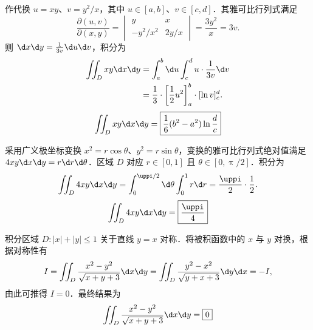 \begin{solution}
    作代换 $u = xy$、$v = y^2/x$，其中 $u \in [a, b]$、$v \in [c, d]$．其雅可比行列式满足
    \begin{equation}
        \frac{\partial(u,v)}{\partial(x,y)} = \begin{vmatrix} y & x \\ -y^2/x^2 & 2y/x \end{vmatrix} = \frac{3y^2}{x} = 3v.
    \end{equation}
    则 $\d x \d y = \frac{1}{3v} \d u \d v$，积分为
    \begin{equation}
        \begin{aligned}
            \iint_D xy \d x \d y & = \int_a^b \d u \int_c^d u \cdot \frac{1}{3v} \d v                       \\
                                 & = \frac{1}{3} \cdot \left[ \frac{1}{2}u^2 \right]_a^b \cdot [\ln v]_c^d.
        \end{aligned}
    \end{equation}
    \begin{equation}
        \iint_D xy \d x \d y = \boxed{\frac{1}{6}(b^2-a^2) \ln \frac{d}{c}}
    \end{equation}


    采用广义极坐标变换 $x^2 = r \cos \theta$、$y^2 = r \sin \theta$，变换的雅可比行列式绝对值满足 $4xy \d x \d y = r \d r \d \theta$．区域 $D$ 对应 $r \in [0, 1]$ 且 $\theta \in [0, \uppi/2]$．积分为
    \begin{equation}
        \iint_D 4xy \d x \d y = \int_0^{\uppi/2} \d \theta \int_0^1 r \d r = \frac{\uppi}{2} \cdot \frac{1}{2}.
    \end{equation}
    \begin{equation}
        \iint_D 4xy \d x \d y = \boxed{\frac{\uppi}{4}}
    \end{equation}


    积分区域 $D: |x|+|y| \le 1$ 关于直线 $y=x$ 对称．将被积函数中的 $x$ 与 $y$ 对换，根据对称性有
    \begin{equation}
        I = \iint_D \frac{x^2-y^2}{\sqrt{x+y+3}} \d x \d y = \iint_D \frac{y^2-x^2}{\sqrt{y+x+3}} \d y \d x = -I,
    \end{equation}
    由此可推得 $I = 0$．最终结果为
    \begin{equation}
        \iint_D \frac{x^2-y^2}{\sqrt{x+y+3}} \d x \d y = \boxed{0}
    \end{equation}


\end{solution}
